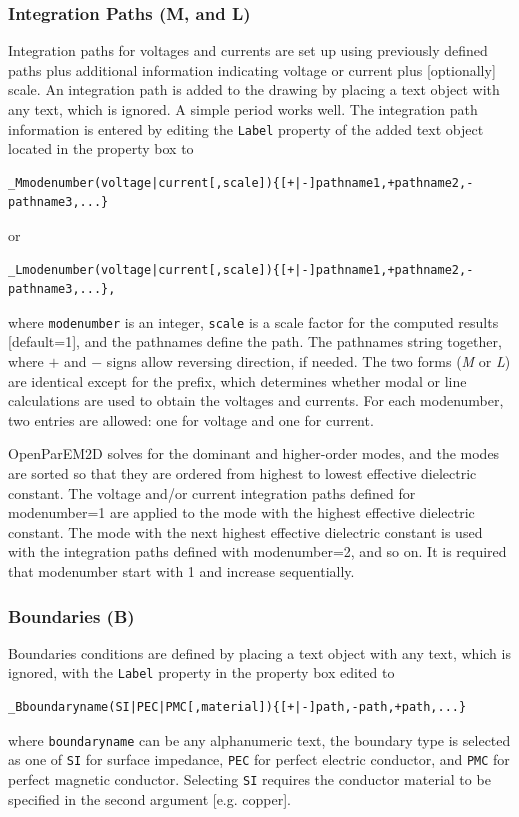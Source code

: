 \documentclass[titlepage]{article}
\renewcommand\_{\textunderscore\linebreak[1]}
\begin{document}
\subsubsection{Integration Paths (\_M, and \_L)}
\label{sec:integration_paths}

Integration paths for voltages and currents are set up using previously defined paths plus additional information indicating voltage or current plus [optionally] scale. An integration path is added to the drawing by placing a text object with any text, which is ignored.  A simple period works well.  The integration path information is entered by editing the \texttt{Label} property of the added text object located in the property box to
\begin{Verbatim}[fontsize=\small]
  _Mmodenumber(voltage|current[,scale]){[+|-]pathname1,+pathname2,-pathname3,...}
\end{Verbatim}
\noindent or
\begin{Verbatim}[fontsize=\small]
  _Lmodenumber(voltage|current[,scale]){[+|-]pathname1,+pathname2,-pathname3,...},
\end{Verbatim}
\noindent where \texttt{modenumber} is an integer, \texttt{scale} is a scale factor for the computed results [default=1], and the pathnames define the path.  The pathnames string together, where $+$ and $-$ signs allow reversing direction, if needed.  The two forms (\textit{\_M} or \textit{\_L}) are identical except for the prefix, which determines whether modal or line calculations are used to obtain the voltages and currents.  For each modenumber, two entries are allowed: one for voltage and one for current.

OpenParEM2D solves for the dominant and higher-order modes, and the modes are sorted so that they are ordered from highest to lowest effective dielectric constant.  The voltage and/or current integration paths defined for modenumber=1 are applied to the mode with the highest effective dielectric constant. The mode with the next highest effective dielectric constant is used with the integration paths defined with modenumber=2, and so on.  It is required that modenumber start with 1 and increase sequentially.

\subsubsection{Boundaries (\_B)}

Boundaries conditions are defined by placing a text object with any text, which is ignored, with the \texttt{Label} property in the property box edited to
\begin{Verbatim}[fontsize=\small]
  _Bboundaryname(SI|PEC|PMC[,material]){[+|-]path,-path,+path,...}
\end{Verbatim}
\noindent where \texttt{boundaryname} can be any alphanumeric text, the boundary type is selected as one of \texttt{SI} for surface impedance, \texttt{PEC} for perfect electric conductor, and \texttt{PMC} for perfect magnetic conductor.  Selecting \texttt{SI} requires the conductor material to be specified in the second argument [e.g. copper].
\end{document}
